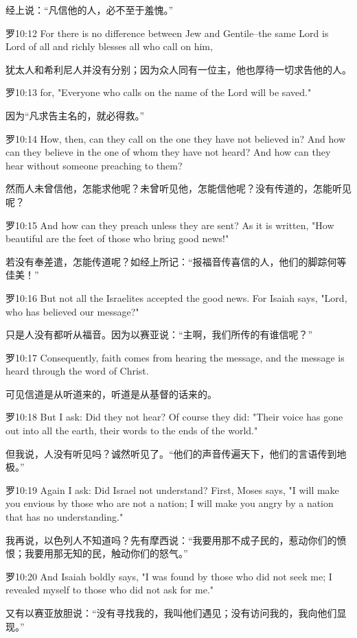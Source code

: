 \documentclass[a4paper,11pt,onecolumn,twoside]{ctexart}
\begin{document}
\begin{multicols}{2}
 经上说：“凡信他的人，必不至于羞愧。”


 罗10:12
 For there is no difference between Jew and Gentile--the same Lord is Lord of all and richly blesses all who call on him,

 犹太人和希利尼人并没有分别；因为众人同有一位主，他也厚待一切求告他的人。


 罗10:13
 for, "Everyone who calls on the name of the Lord will be saved."

 因为“凡求告主名的，就必得救。”


 罗10:14
 How, then, can they call on the one they have not believed in? And how can they believe in the one of whom they have not heard? And how can they hear without someone preaching to them?

 然而人未曾信他，怎能求他呢？未曾听见他，怎能信他呢？没有传道的，怎能听见呢？


 罗10:15
 And how can they preach unless they are sent? As it is written, "How beautiful are the feet of those who bring good news!"

 若没有奉差遣，怎能传道呢？如经上所记：“报福音传喜信的人，他们的脚踪何等佳美！”


 罗10:16
 But not all the Israelites accepted the good news. For Isaiah says, "Lord, who has believed our message?"

 只是人没有都听从福音。因为以赛亚说：“主啊，我们所传的有谁信呢？”


 罗10:17
 Consequently, faith comes from hearing the message, and the message is heard through the word of Christ.

 可见信道是从听道来的，听道是从基督的话来的。


 罗10:18
 But I ask: Did they not hear? Of course they did: "Their voice has gone out into all the earth, their words to the ends of the world."

 但我说，人没有听见吗？诚然听见了。“他们的声音传遍天下，他们的言语传到地极。”


 罗10:19
 Again I ask: Did Israel not understand? First, Moses says, "I will make you envious by those who are not a nation; I will make you angry by a nation that has no understanding."

 我再说，以色列人不知道吗？先有摩西说：“我要用那不成子民的，惹动你们的愤恨；我要用那无知的民，触动你们的怒气。”


 罗10:20
 And Isaiah boldly says, "I was found by those who did not seek me; I revealed myself to those who did not ask for me."

 又有以赛亚放胆说：“没有寻找我的，我叫他们遇见；没有访问我的，我向他们显现。”



\end{multicols}
\end{document}
